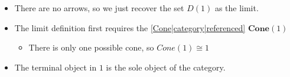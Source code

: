 \begin{itemize}
    \item  There are no arrows, so we just recover the set $D(1)$ as the limit.
    \item The limit definition first requires the \ref{Cone|category|referenced} $\mathbf{Cone}(1)$
          \begin{itemize}
            \item There is only one possible cone, so $Cone(1)\cong 1$
          \end{itemize}
    \item The terminal object in $1$ is the sole object of the category.
  \end{itemize}
